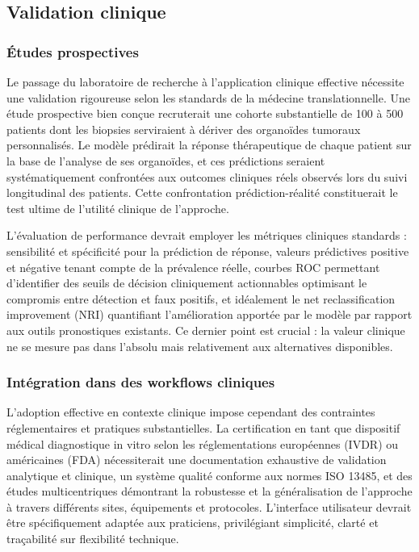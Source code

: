\subsection{Validation clinique}

\subsubsection{Études prospectives}

Le passage du laboratoire de recherche à l'application clinique effective nécessite une validation rigoureuse selon les standards de la médecine translationnelle. Une étude prospective bien conçue recruterait une cohorte substantielle de 100 à 500 patients dont les biopsies serviraient à dériver des organoïdes tumoraux personnalisés. Le modèle prédirait la réponse thérapeutique de chaque patient sur la base de l'analyse de ses organoïdes, et ces prédictions seraient systématiquement confrontées aux outcomes cliniques réels observés lors du suivi longitudinal des patients. Cette confrontation prédiction-réalité constituerait le test ultime de l'utilité clinique de l'approche.

L'évaluation de performance devrait employer les métriques cliniques standards : sensibilité et spécificité pour la prédiction de réponse, valeurs prédictives positive et négative tenant compte de la prévalence réelle, courbes ROC permettant d'identifier des seuils de décision cliniquement actionnables optimisant le compromis entre détection et faux positifs, et idéalement le net reclassification improvement (NRI) quantifiant l'amélioration apportée par le modèle par rapport aux outils pronostiques existants. Ce dernier point est crucial : la valeur clinique ne se mesure pas dans l'absolu mais relativement aux alternatives disponibles.

\subsubsection{Intégration dans des workflows cliniques}

L'adoption effective en contexte clinique impose cependant des contraintes réglementaires et pratiques substantielles. La certification en tant que dispositif médical diagnostique in vitro selon les réglementations européennes (IVDR) ou américaines (FDA) nécessiterait une documentation exhaustive de validation analytique et clinique, un système qualité conforme aux normes ISO 13485, et des études multicentriques démontrant la robustesse et la généralisation de l'approche à travers différents sites, équipements et protocoles. L'interface utilisateur devrait être spécifiquement adaptée aux praticiens, privilégiant simplicité, clarté et traçabilité sur flexibilité technique.

